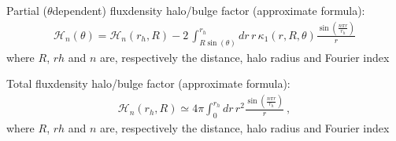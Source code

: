 \documentclass[letterpaper,10pt,english]{sphinxmanual}
\begin{document}
\begin{fulllineitems}
\label{\detokenize{diffsph.utils:diffsph.utils.tools.approxhalo_fd}}
\pysigstartsignatures
{}
\pysigstopsignatures
\sphinxAtStartPar
Partial (\(\theta\)\sphinxhyphen{}dependent) flux\sphinxhyphen{}density halo/bulge factor (approximate formula):
\begin{equation*}
\begin{split}\mathcal H_n(\theta) = \mathcal H_n(r_h,R) - 2\,\int_{R\sin(\theta)}^{r_h}dr\, r\, \kappa_1(r,R,\theta) \frac{\sin\left(\frac{n\pi r}{r_h}\right)}r\end{split}
\end{equation*}
\sphinxAtStartPar
where \(R\), \(rh\) and \(n\) are, respectively the distance, halo radius and Fourier index

\end{fulllineitems}


\begin{fulllineitems}
\label{\detokenize{diffsph.utils:diffsph.utils.tools.approxhalo_fd_tot}}
\pysigstartsignatures
{}
\pysigstopsignatures
\sphinxAtStartPar
Total flux\sphinxhyphen{}density halo/bulge factor (approximate formula):
\begin{equation*}
\begin{split}\mathcal H_n(r_h,R) \simeq 4\pi\int_0^{r_h}dr\, r^2 \frac{\sin\left(\frac{n\pi r}{r_h}\right)}r \ ,\end{split}
\end{equation*}
\sphinxAtStartPar
where \(R\), \(rh\) and \(n\) are, respectively the distance, halo radius and Fourier index

\end{fulllineitems}

\end{document}
